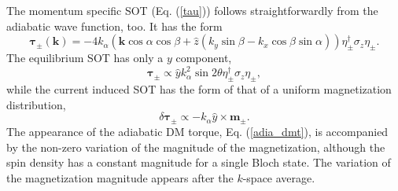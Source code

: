 \documentclass[12pt]{iopart}
\begin{document}
The momentum specific SOT (Eq. (\ref{tau})) follows straightforwardly from the adiabatic wave function, too. It has the form
\begin{equation}
\bm {\tau} _\pm (\textbf{k}) = - 4 k_\alpha (\textbf{k} \cos \alpha \cos \beta + \hat {z} (k_y \sin \beta - k_x \cos \beta \sin \alpha))\eta ^\dagger _\pm \sigma_z \eta _\pm.
\end{equation}
The equilibrium SOT has only a $y$ component,
\begin{equation}
\bm {\tau} _\pm \propto \hat {y} k_\alpha^2 \sin 2 \theta \eta ^\dagger _\pm \sigma_z \eta _\pm,
\label{adia_dmt}
\end{equation}
while the current induced SOT has the form of that of a uniform magnetization distribution,
\begin{equation}
\delta \bm {\tau} _\pm \propto - k_\alpha \hat {y} \times \textbf{m}_\pm.
\end{equation}
The appearance of the adiabatic DM torque, Eq. (\ref{adia_dmt}), is accompanied by the non-zero variation of the magnitude of the magnetization, although the spin density has a constant magnitude for a single Bloch state. The variation of the magnetization magnitude appears after the $k$-space average.
\end{document}
